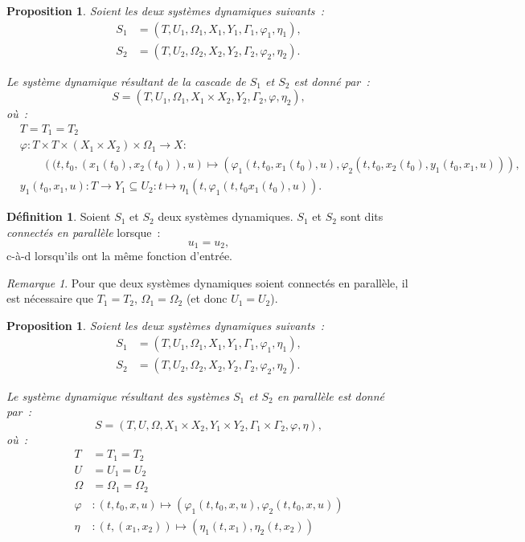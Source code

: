 \documentclass{article}
\newtheorem{prp}[thm]{Proposition}
\theoremstyle{definition}
\newtheorem{déf}[thm]{Définition}
\theoremstyle{remark}
\newtheorem*{rmq}{Remarque}
\begin{document}
	\begin{prp} Soient les deux systèmes dynamiques suivants~:
	\begin{align*}
		S_1 &= \left(T, U_1, \Omega_1, X_1, Y_1, \Gamma_1, \varphi_1, \eta_1\right), \\
		S_2 &= \left(T, U_2, \Omega_2, X_2, Y_2, \Gamma_2, \varphi_2, \eta_2\right).
	\end{align*}

	Le système dynamique résultant de la cascade de $S_1$ et $S_2$ est donné par~:
	\[S = \left(T, U_1, \Omega_1, X_1 \times X_2, Y_2, \Gamma_2, \varphi, \eta_2\right),\]
	où~:
	\begin{align*}
		&T = T_1 = T_2 \\
		&\varphi : T \times T \times (X_1 \times X_2) \times \Omega_1 \to X : \\
		&\qquad\left((t, t_0, \left(x_1(t_0), x_2(t_0)\right), u\right) \mapsto
				\left(\varphi_1\left(t, t_0, x_1(t_0), u\right), \varphi_2\left(t, t_0, x_2(t_0), y_1(t_0, x_1, u)\right)\right), \\
		&y_1(t_0, x_1, u) : T \to Y_1 \subseteq U_2 : t \mapsto \eta_1\left(t, \varphi_1\left(t, t_0 x_1(t_0), u\right)\right).
	\end{align*}
	\end{prp}

	\begin{déf} Soient $S_1$ et $S_2$ deux systèmes dynamiques. $S_1$ et $S_2$ sont dits \textit{connectés en parallèle} lorsque~:
	\[u_1 = u_2,\]
	c-à-d lorsqu'ils ont la même fonction d'entrée.
	\end{déf}

	\begin{rmq} Pour que deux systèmes dynamiques soient connectés en parallèle, il est nécessaire que $T_1 = T_2$, $\Omega_1 = \Omega_2$ (et donc $U_1 = U_2$).
	\end{rmq}

	\begin{prp} Soient les deux systèmes dynamiques suivants~:
	\begin{align*}
		S_1 &= \left(T, U_1, \Omega_1, X_1, Y_1, \Gamma_1, \varphi_1, \eta_1\right), \\
		S_2 &= \left(T, U_2, \Omega_2, X_2, Y_2, \Gamma_2, \varphi_2, \eta_2\right).
	\end{align*}

	Le système dynamique résultant des systèmes $S_1$ et $S_2$ en parallèle est donné par~:
	\[S = \left(T, U, \Omega, X_1 \times X_2, Y_1 \times Y_2, \Gamma_1 \times \Gamma_2, \varphi, \eta\right),\]
	où~:
	\begin{align*}
		T &= T_1 = T_2 \\
		U &= U_1 = U_2 \\
		\Omega &= \Omega_1 = \Omega_2 \\
		\varphi &: (t, t_0, x, u) \mapsto \left(\varphi_1(t, t_0, x, u), \varphi_2(t, t_0, x, u)\right) \\
		\eta &: \left(t, (x_1, x_2)\right) \mapsto \left(\eta_1(t, x_1), \eta_2(t, x_2)\right)
	\end{align*}
	\end{prp}
\end{document}
